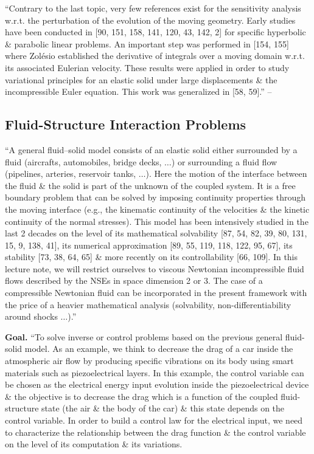 \documentclass[oneside]{book}
\numberwithin{equation}{section}
\begin{document}
``Contrary to the last topic, very few references exist for the sensitivity analysis w.r.t. the perturbation of the evolution of the moving geometry. Early studies have been conducted in [90, 151, 158, 141, 120, 43, 142, 2] for specific hyperbolic \& parabolic linear problems. An important step was performed in [154, 155] where Zol\'esio established the derivative of integrals over a moving domain w.r.t. its associated Eulerian velocity. These results were applied in order to study variational principles for an elastic solid under large displacements \& the incompressible Euler equation. This work was generalized in [58, 59].'' -- \cite[Chap. 1, Sect. 1.1, pp. 3--4]{Moubachir_Zolesio2006}

\subsection{Fluid-Structure Interaction Problems}
``A general fluid--solid model consists of an elastic solid either surrounded by a fluid (aircrafts, automobiles, bridge decks, $\ldots$) or surrounding a fluid flow (pipelines, arteries, reservoir tanks, $\ldots$). Here the motion of the interface between the fluid \& the solid is part of the unknown of the coupled system. It is a free boundary problem that can be solved by imposing continuity properties through the moving interface (e.g., the kinematic continuity of the velocities \& the kinetic continuity of the normal stresses). This model has been intensively studied in the last 2 decades on the level of its mathematical solvability [87, 54, 82, 39, 80, 131, 15, 9, 138, 41], its numerical approximation [89, 55, 119, 118, 122, 95, 67], its stability [73, 38, 64, 65] \& more recently on its controllability [66, 109]. In this lecture note, we will restrict ourselves to viscous Newtonian incompressible fluid flows described by the NSEs in space dimension 2 or 3. The case of a compressible Newtonian fluid can be incorporated in the present framework with the price of a heavier mathematical analysis (solvability, non-differentiability around shocks $\ldots$).''

\textbf{Goal.} ``To solve inverse or control problems based on the previous general fluid-solid model. As an example, we think to decrease the drag of a car inside the atmospheric air flow by producing specific vibrations on its body using smart materials such as piezoelectrical layers. In this example, the control variable can be chosen as the electrical energy input evolution inside the piezoelectrical device \& the objective is to decrease the drag which is a function of the coupled fluid-structure state (the air \& the body of the car) \& this state depends on the control variable. In order to build a control law for the electrical input, we need to characterize the relationship between the drag function \& the control variable on the level of its computation \& its variations.
\end{document}
